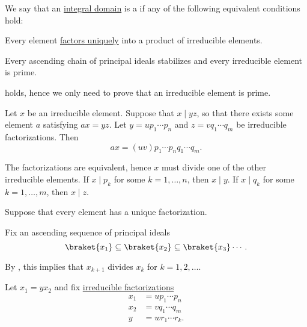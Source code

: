 \begin{definition}\label{def:unique_factorization_domain}
  We say that an \hyperref[def:integral_domain]{integral domain} is a  if any of the following equivalent conditions hold:
  \begin{thmenum}
     Every element \hyperref[def:irreducible_factorization]{factors uniquely} into a product of irreducible elements.

     Every ascending chain of principal ideals stabilizes and every irreducible element is prime.
  \end{thmenum}
\end{definition}
\begin{defproof}

   holds, hence we only need to prove that an irreducible element is prime.

  Let \( x \) be an irreducible element. Suppose that \( x \mid yz \), so that there exists some element \( a \) satisfying \( ax = yz \).
  Let \( y = u p_1 \cdots p_n \) and \( z = v q_1 \cdots q_m \) be irreducible factorizations. Then
  \begin{equation*}
    ax = (uv) p_1 \cdots p_n q_1 \cdots q_m.
  \end{equation*}

  The factorizations are equivalent, hence \( x \) must divide one of the other irreducible elements. If \( x \mid p_k \) for some \( k = 1, \ldots, n \), then \( x \mid y \). If \( x \mid q_k \) for some \( k = 1, \ldots, m \), then \( x \mid z \).

   Suppose that every element has a unique factorization.

  Fix an ascending sequence of principal ideals
  \begin{equation*}
    \braket{ x_1 } \subseteq \braket{ x_2 } \subseteq \braket{ x_3 } \cdots.
  \end{equation*}

  By , this implies that \( x_{k+1} \) divides \( x_k \) for \( k = 1, 2, \ldots \).

  Let \( x_1 = y x_2 \) and fix \hyperref[def:irreducible_factorization]{irreducible factorizations}
  \begin{align*}
    x_1 &= u p_1 \cdots p_n \\
    x_2 &= v q_1 \cdots q_m \\
    y   &= w r_1 \cdots r_k.
  \end{align*}


\end{defproof}
